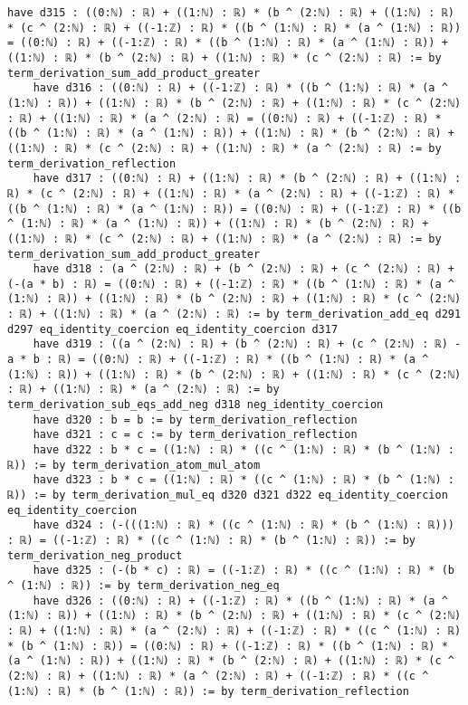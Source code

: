 \documentclass{article}
\begin{document}
\begin{tcolorbox}[colback=white!10, width=\linewidth]
\begin{lstlisting}[language=Lean4]
    have d315 : ((0:ℕ) : ℝ) + ((1:ℕ) : ℝ) * (b ^ (2:ℕ) : ℝ) + ((1:ℕ) : ℝ) * (c ^ (2:ℕ) : ℝ) + ((-1:ℤ) : ℝ) * ((b ^ (1:ℕ) : ℝ) * (a ^ (1:ℕ) : ℝ)) = ((0:ℕ) : ℝ) + ((-1:ℤ) : ℝ) * ((b ^ (1:ℕ) : ℝ) * (a ^ (1:ℕ) : ℝ)) + ((1:ℕ) : ℝ) * (b ^ (2:ℕ) : ℝ) + ((1:ℕ) : ℝ) * (c ^ (2:ℕ) : ℝ) := by term_derivation_sum_add_product_greater
    have d316 : ((0:ℕ) : ℝ) + ((-1:ℤ) : ℝ) * ((b ^ (1:ℕ) : ℝ) * (a ^ (1:ℕ) : ℝ)) + ((1:ℕ) : ℝ) * (b ^ (2:ℕ) : ℝ) + ((1:ℕ) : ℝ) * (c ^ (2:ℕ) : ℝ) + ((1:ℕ) : ℝ) * (a ^ (2:ℕ) : ℝ) = ((0:ℕ) : ℝ) + ((-1:ℤ) : ℝ) * ((b ^ (1:ℕ) : ℝ) * (a ^ (1:ℕ) : ℝ)) + ((1:ℕ) : ℝ) * (b ^ (2:ℕ) : ℝ) + ((1:ℕ) : ℝ) * (c ^ (2:ℕ) : ℝ) + ((1:ℕ) : ℝ) * (a ^ (2:ℕ) : ℝ) := by term_derivation_reflection
    have d317 : ((0:ℕ) : ℝ) + ((1:ℕ) : ℝ) * (b ^ (2:ℕ) : ℝ) + ((1:ℕ) : ℝ) * (c ^ (2:ℕ) : ℝ) + ((1:ℕ) : ℝ) * (a ^ (2:ℕ) : ℝ) + ((-1:ℤ) : ℝ) * ((b ^ (1:ℕ) : ℝ) * (a ^ (1:ℕ) : ℝ)) = ((0:ℕ) : ℝ) + ((-1:ℤ) : ℝ) * ((b ^ (1:ℕ) : ℝ) * (a ^ (1:ℕ) : ℝ)) + ((1:ℕ) : ℝ) * (b ^ (2:ℕ) : ℝ) + ((1:ℕ) : ℝ) * (c ^ (2:ℕ) : ℝ) + ((1:ℕ) : ℝ) * (a ^ (2:ℕ) : ℝ) := by term_derivation_sum_add_product_greater
    have d318 : (a ^ (2:ℕ) : ℝ) + (b ^ (2:ℕ) : ℝ) + (c ^ (2:ℕ) : ℝ) + (-(a * b) : ℝ) = ((0:ℕ) : ℝ) + ((-1:ℤ) : ℝ) * ((b ^ (1:ℕ) : ℝ) * (a ^ (1:ℕ) : ℝ)) + ((1:ℕ) : ℝ) * (b ^ (2:ℕ) : ℝ) + ((1:ℕ) : ℝ) * (c ^ (2:ℕ) : ℝ) + ((1:ℕ) : ℝ) * (a ^ (2:ℕ) : ℝ) := by term_derivation_add_eq d291 d297 eq_identity_coercion eq_identity_coercion d317
    have d319 : ((a ^ (2:ℕ) : ℝ) + (b ^ (2:ℕ) : ℝ) + (c ^ (2:ℕ) : ℝ) - a * b : ℝ) = ((0:ℕ) : ℝ) + ((-1:ℤ) : ℝ) * ((b ^ (1:ℕ) : ℝ) * (a ^ (1:ℕ) : ℝ)) + ((1:ℕ) : ℝ) * (b ^ (2:ℕ) : ℝ) + ((1:ℕ) : ℝ) * (c ^ (2:ℕ) : ℝ) + ((1:ℕ) : ℝ) * (a ^ (2:ℕ) : ℝ) := by term_derivation_sub_eqs_add_neg d318 neg_identity_coercion
    have d320 : b = b := by term_derivation_reflection
    have d321 : c = c := by term_derivation_reflection
    have d322 : b * c = ((1:ℕ) : ℝ) * ((c ^ (1:ℕ) : ℝ) * (b ^ (1:ℕ) : ℝ)) := by term_derivation_atom_mul_atom
    have d323 : b * c = ((1:ℕ) : ℝ) * ((c ^ (1:ℕ) : ℝ) * (b ^ (1:ℕ) : ℝ)) := by term_derivation_mul_eq d320 d321 d322 eq_identity_coercion eq_identity_coercion
    have d324 : (-(((1:ℕ) : ℝ) * ((c ^ (1:ℕ) : ℝ) * (b ^ (1:ℕ) : ℝ))) : ℝ) = ((-1:ℤ) : ℝ) * ((c ^ (1:ℕ) : ℝ) * (b ^ (1:ℕ) : ℝ)) := by term_derivation_neg_product
    have d325 : (-(b * c) : ℝ) = ((-1:ℤ) : ℝ) * ((c ^ (1:ℕ) : ℝ) * (b ^ (1:ℕ) : ℝ)) := by term_derivation_neg_eq
    have d326 : ((0:ℕ) : ℝ) + ((-1:ℤ) : ℝ) * ((b ^ (1:ℕ) : ℝ) * (a ^ (1:ℕ) : ℝ)) + ((1:ℕ) : ℝ) * (b ^ (2:ℕ) : ℝ) + ((1:ℕ) : ℝ) * (c ^ (2:ℕ) : ℝ) + ((1:ℕ) : ℝ) * (a ^ (2:ℕ) : ℝ) + ((-1:ℤ) : ℝ) * ((c ^ (1:ℕ) : ℝ) * (b ^ (1:ℕ) : ℝ)) = ((0:ℕ) : ℝ) + ((-1:ℤ) : ℝ) * ((b ^ (1:ℕ) : ℝ) * (a ^ (1:ℕ) : ℝ)) + ((1:ℕ) : ℝ) * (b ^ (2:ℕ) : ℝ) + ((1:ℕ) : ℝ) * (c ^ (2:ℕ) : ℝ) + ((1:ℕ) : ℝ) * (a ^ (2:ℕ) : ℝ) + ((-1:ℤ) : ℝ) * ((c ^ (1:ℕ) : ℝ) * (b ^ (1:ℕ) : ℝ)) := by term_derivation_reflection

\end{lstlisting}
\end{tcolorbox}
\end{document}
